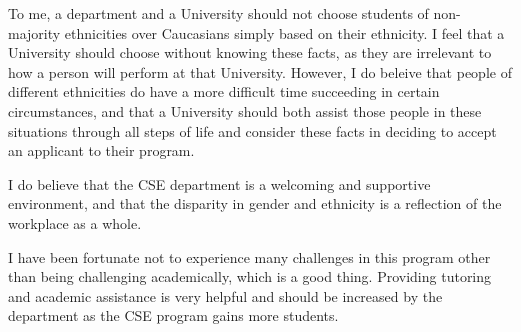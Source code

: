 \documentclass{article}
\begin{document}
To me, a department and a University should not choose students of non-majority ethnicities over Caucasians simply based on their ethnicity.  I feel that a University should choose without knowing these facts, as they are irrelevant to how a person will perform at that University.  However, I do beleive that people of different ethnicities do have a more difficult time succeeding in certain circumstances, and that a University should both assist those people in these situations through all steps of life and consider these facts in deciding to accept an applicant to their program. 

I do believe that the CSE department is a welcoming and supportive environment, and that the disparity in gender and ethnicity is a reflection of the workplace as a whole. 

I have been fortunate not to experience many challenges in this program other than being challenging academically, which is a good thing.  Providing tutoring and academic assistance is very helpful and should be increased by the department as the CSE program gains more students.
\end{document}
